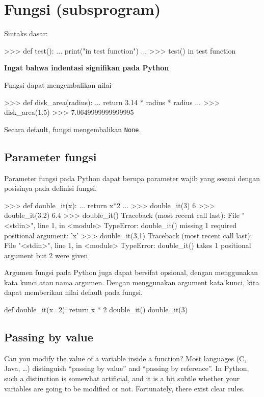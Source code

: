 \section{Fungsi (subsprogram)}

Sintaks dasar:
\begin{pyconcode}
>>> def test():
...     print("in test function")
...
>>> test()
in test function
\end{pyconcode}

\textbf{Ingat bahwa indentasi signifikan pada Python}

Fungsi dapat mengembalikan nilai
\begin{pyconcode}
>>> def disk_area(radius):
...     return 3.14 * radius * radius
...
>>> disk_area(1.5)
>>> 7.0649999999999995
\end{pyconcode}

Secara default, fungsi mengembalikan \texttt{None}.

\subsection{Parameter fungsi}

Parameter fungsi pada Python dapat berupa parameter wajib yang sesuai
dengan posisinya pada definisi fungsi.

\begin{pyconcode}
>>> def double_it(x):
...     return x*2
... 
>>> double_it(3)
6
>>> double_it(3.2)
6.4
>>> double_it()
Traceback (most recent call last):
  File "<stdin>", line 1, in <module>
TypeError: double_it() missing 1 required positional argument: 'x'
>>> double_it(3,1)
Traceback (most recent call last):
  File "<stdin>", line 1, in <module>
TypeError: double_it() takes 1 positional argument but 2 were given
\end{pyconcode}

Argumen fungsi pada Python juga dapat bersifat
opsional, dengan menggunakan kata kunci atau nama argumen.
Dengan menggunakan argument kata kunci, kita dapat memberikan nilai
default pada fungsi.
\begin{pythoncode}
def double_it(x=2):
    return x * 2
double_it()
double_it(3)
\end{pythoncode}


\subsection{Passing by value}

Can you modify the value of a variable inside a function? Most languages (C, Java, …)
distinguish “passing by value” and “passing by reference”. In Python, such a distinction
is somewhat artificial, and it is a bit subtle whether your variables are going to be modified
or not. Fortunately, there exist clear rules.

